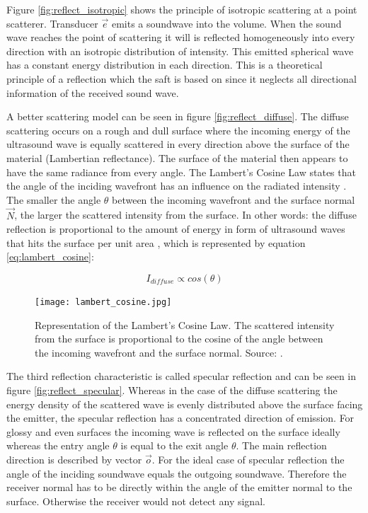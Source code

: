 Figure \ref{fig:reflect_isotropic} shows the principle of isotropic scattering at a point scatterer. Transducer $\overrightarrow{e}$ emits a soundwave into the volume. When the sound wave reaches the point of scattering it will is reflected homogeneously into every direction with an isotropic distribution of intensity. This emitted spherical wave has a constant energy distribution in each direction. This is a theoretical principle of a reflection which the \ac{saft} is based on since it neglects all directional information of the received sound wave.

A better scattering model can be seen in figure \ref{fig:reflect_diffuse}. The diffuse scattering occurs on a rough and dull surface where the incoming energy of the ultrasound wave is equally scattered in every direction above the surface of the material (Lambertian reflectance). The surface of the material then appears to have the same radiance from every angle. The Lambert's Cosine Law states that the angle of the inciding wavefront has an influence on the radiated intensity \cite{lambert1892lamberts}.
The smaller the angle $\theta$ between the incoming wavefront and the surface normal $\overrightarrow{N}$, the larger the scattered intensity from the surface. In other words: the diffuse reflection is proportional to the amount of energy in form of ultrasound waves that hits the surface per unit area \cite{illum_Phong}, which is represented by equation \ref{eq:lambert_cosine}:

\begin{equation}
I_{diffuse} \propto cos(\theta)
\label{eq:lambert_cosine}
\end{equation}



\begin{figure}[H]
    \centering
    \texttt{[image: lambert\_cosine.jpg]}
    \caption{Representation of the Lambert's Cosine Law. The scattered intensity from the surface is proportional to the cosine of the angle between the incoming wavefront and the surface normal. Source: \cite{illum_Phong}.}
    \label{Lambert_cosine_law}
\end{figure}


The third reflection characteristic is called specular reflection and can be seen in figure \ref{fig:reflect_specular}. Whereas in the case of the diffuse scattering the energy density of the scattered wave is evenly distributed above the surface facing the emitter, the specular reflection has a concentrated direction of emission. For glossy and even surfaces the incoming wave is reflected on the surface ideally whereas the entry angle  $\theta$ is equal to the exit angle $\theta$.
The main reflection direction is described by vector $\overrightarrow{o}$. For the ideal case of specular reflection the angle of the inciding soundwave equals the outgoing soundwave. Therefore the receiver normal has to be directly within the angle of the emitter normal to the surface. Otherwise the receiver would not detect any signal. 

